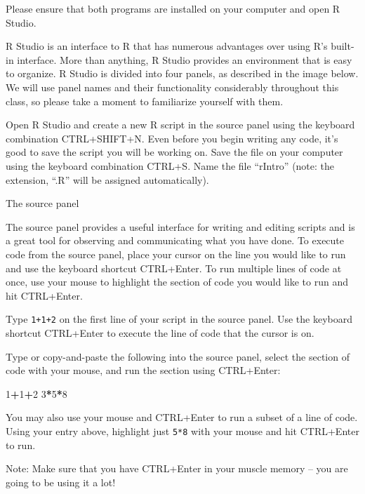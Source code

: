 \documentclass[]{article}
\newenvironment{Shaded}{\begin{snugshade}}{\end{snugshade}}
\newcommand{\DecValTok}[1]{\textcolor[rgb]{0.00,0.00,0.81}{#1}}
\newcommand{\OperatorTok}[1]{\textcolor[rgb]{0.81,0.36,0.00}{\textbf{#1}}}
\begin{document}
 Please ensure that both programs are installed on your computer and
open R Studio.

R Studio is an interface to R that has numerous advantages over using
R's built-in interface. More than anything, R Studio provides an
environment that is easy to organize. R Studio is divided into four
panels, as described in the image below. We will use panel names and
their functionality considerably throughout this class, so please take a
moment to familiarize yourself with them.

 Open R Studio and create a new R script in the source panel using the
keyboard combination CTRL+SHIFT+N. Even before you begin writing any
code, it's good to save the script you will be working on. Save the file
on your computer using the keyboard combination CTRL+S. Name the file
``rIntro'' (note: the extension, ``.R'' will be assigned automatically).

The source panel

The source panel provides a useful interface for writing and editing
scripts and is a great tool for observing and communicating what you
have done. To execute code from the source panel, place your cursor on
the line you would like to run and use the keyboard shortcut CTRL+Enter.
To run multiple lines of code at once, use your mouse to highlight the
section of code you would like to run and hit CTRL+Enter.

 Type \texttt{1+1+2} on the first line of your script in the source
panel. Use the keyboard shortcut CTRL+Enter to execute the line of code
that the cursor is on.

 Type or copy-and-paste the following into the source panel, select the
section of code with your mouse, and run the section using CTRL+Enter:

\begin{Shaded}
\begin{Highlighting}[]
\DecValTok{1}\OperatorTok{+}\DecValTok{1}\OperatorTok{+}\DecValTok{2}
\DecValTok{3}\OperatorTok{*}\DecValTok{5}\OperatorTok{*}\DecValTok{8}
\end{Highlighting}
\end{Shaded}

 You may also use your mouse and CTRL+Enter to run a subset of a line of
code. Using your entry above, highlight just \texttt{5*8} with your
mouse and hit CTRL+Enter to run.

Note: Make sure that you have CTRL+Enter in your muscle memory -- you
are going to be using it a lot!
\end{document}

